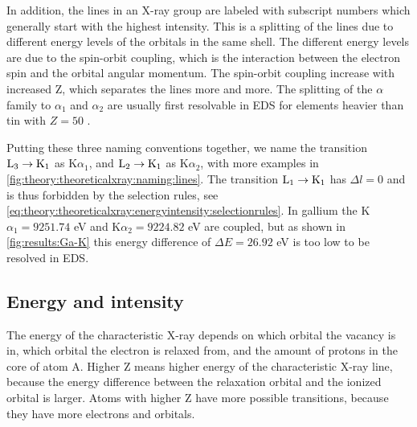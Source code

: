 In addition, the lines in an X-ray group are labeled with subscript numbers which generally start with the highest intensity. %
This is a splitting of the lines due to different energy levels of the orbitals in the same shell.
The different energy levels are due to the spin-orbit coupling, which is the interaction between the electron spin and the orbital angular momentum.
The spin-orbit coupling increase with increased Z, which separates the lines more and more.
The splitting of the $\alpha$ family to $\alpha_1$ and $\alpha_2$ are usually first resolvable in EDS for elements heavier than tin with $ Z = 50$ \cite[Ch. 8.2.2.3]{hollas_modern_2004}. %

Putting these three naming conventions together, we name the transition $\textnormal{L}_3 \rightarrow \textnormal{K}_1$ as K$\alpha_1$, and $\textnormal{L}_2 \rightarrow \textnormal{K}_1$ as K$\alpha_2$, with more examples in \cref{fig:theory:theoreticalxray:naming:lines}.
The transition $\textnormal{L}_1 \rightarrow \textnormal{K}_1$ has $\Delta l = 0$ and is thus forbidden by the selection rules, see \cref{eq:theory:theoreticalxray:energyintensity:selectionrules}.
In gallium the K$\alpha_1 = 9251.74$ eV and K$\alpha_2 = 9224.82$ eV \cite{thompson_x-ray_2004} are coupled, but as shown in \cref{fig:results:Ga-K} this energy difference of $\Delta E = 26.92$ eV is too low to be resolved in EDS.














\subsection{Energy and intensity}
\label{sec:theory:theoreticalxray:energyintensity}

The energy of the characteristic X-ray depends on which orbital the vacancy is in, which orbital the electron is relaxed from, and the amount of protons in the core of atom A. %
Higher Z means higher energy of the characteristic X-ray line, because the energy difference between the relaxation orbital and the ionized orbital is larger.
Atoms with higher Z have more possible transitions, because they have more  electrons and orbitals.

